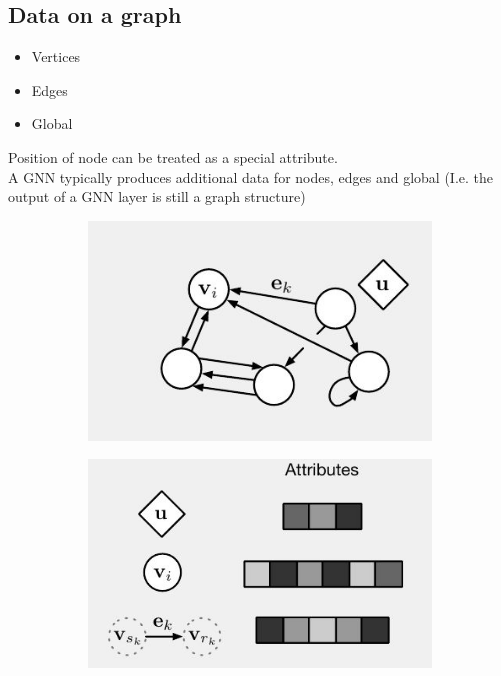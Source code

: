 \subsection{Data on a graph}
\begin{itemize}
	\item Vertices
	\item Edges
	\item Global
\end{itemize}

Position of node can be treated as a special attribute.\\

A GNN typically produces additional data for nodes, edges and global (I.e. the output of a GNN layer is still a graph
structure)

\begin{figure}[ht]
	\centering
	\begin{subfigure}{.5\textwidth}
		\centering
		\includegraphics[width=0.8\linewidth]{figure_ml/datagraph1}
	\end{subfigure}%
	\begin{subfigure}{.5\textwidth}
		\centering
		\includegraphics[width=0.8\linewidth]{figure_ml/datagraph2}
	\end{subfigure}%
\end{figure}
\FloatBarrier
